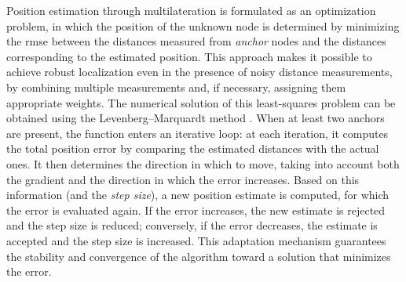 \documentclass[runningheads]{llncs}
\begin{document}
Position estimation through multilateration \cite{DBLP:conf/cist/AsmaaHM14} is formulated as an optimization problem, in which the position of the unknown node is determined by minimizing the \ac{rmse} between the distances measured from \emph{anchor} nodes and the distances corresponding to the estimated position. This approach makes it possible to achieve robust localization even in the presence of noisy distance measurements, by combining multiple measurements and, if necessary, assigning them appropriate weights. The numerical solution of this least-squares problem can be obtained using the Levenberg–Marquardt method \cite{DBLP:journals/cj/BasterrechMRS11}. When at least two anchors are present, the function enters an iterative loop: at each iteration, it computes the total position error by comparing the estimated distances with the actual ones. It then determines the direction in which to move, taking into account both the gradient and the direction in which the error increases. Based on this information (and the \emph{step size}), a new position estimate is computed, for which the error is evaluated again. If the error increases, the new estimate is rejected and the step size is reduced; conversely, if the error decreases, the estimate is accepted and the step size is increased. This adaptation mechanism guarantees the stability and convergence of the algorithm toward a solution that minimizes the error.
\end{document}
